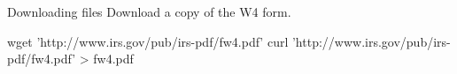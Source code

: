 \begin{block}{Downloading files}
  Download a copy of the W4 form.
  \begin{bashcode}
    wget 'http://www.irs.gov/pub/irs-pdf/fw4.pdf'
    curl 'http://www.irs.gov/pub/irs-pdf/fw4.pdf' > fw4.pdf
  \end{bashcode}
\end{block}
